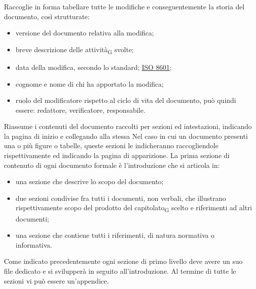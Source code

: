    Raccoglie in forma tabellare tutte le modifiche e conseguentemente la storia del documento, così strutturate:
    \begin{itemize}
        \item versione del documento relativa alla modifica;
        \item breve descrizione delle attività\textsubscript{G} svolte;
        \item data della modifica, secondo lo standard; \href{https://www.iso.org/iso-8601-date-and-time-format.html}{ISO 8601};
        \item cognome e nome di chi ha apportato la modifica;
        \item ruolo del modificatore rispetto al ciclo di vita del documento, può quindi essere: redattore, verificatore, responsabile.
    \end{itemize}
    Riassume i contenuti del documento raccolti per sezioni ed intestazioni, indicando la pagina di inizio e collegando alla stessa
    Nel caso in cui un documento presenti una o più figure o tabelle, queste sezioni le indicheranno raccogliendole rispettivamente ed indicando la pagina di apparizione.
    La prima sezione di contenuto di ogni documento formale è l'introduzione che si articola in:
    \begin{itemize}
        \item una sezione che descrive lo scopo del documento;
        \item due sezioni condivise fra tutti i documenti, non verbali, che illustrano rispettivamente scopo del prodotto del capitolato\textsubscript{G} scelto e riferimenti ad altri documenti;
        \item una sezione che contiene tutti i riferimenti, di natura normativa o informativa.
    \end{itemize}
    Come indicato precedentemente ogni sezione di primo livello deve avere un suo file dedicato e si svilupperà in seguito all'introduzione. Al termine di tutte le sezioni vi può essere un'appendice.

